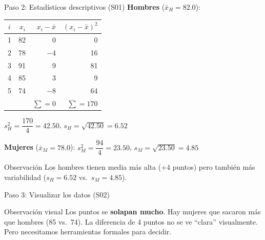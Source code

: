 \documentclass[aspectratio=169, 11pt]{beamer}
\begin{document}
\begin{frame}{Paso 2: Estadísticos descriptivos (S01)}
\small
\textbf{Hombres} ($\bar{x}_H = 82.0$):
\begin{center}
\footnotesize
\begin{tabular}{crrr}
\toprule
$i$ & $x_i$ & $x_i - \bar{x}$ & $(x_i - \bar{x})^2$ \\
\midrule
1 & 82 & 0 & 0 \\
2 & 78 & $-4$ & 16 \\
3 & 91 & 9 & 81 \\
4 & 85 & 3 & 9 \\
5 & 74 & $-8$ & 64 \\
\midrule
 & & $\sum = 0$ & $\sum = 170$ \\
\bottomrule
\end{tabular}
\end{center}
$s_H^2 = \dfrac{170}{4} = 42.50$, \quad $s_H = \sqrt{42.50} = 6.52$

\vspace{0.2cm}
\textbf{Mujeres} ($\bar{x}_M = 78.0$): \quad
$s_M^2 = \dfrac{94}{4} = 23.50$, \quad $s_M = \sqrt{23.50} = 4.85$

\vspace{0.2cm}
\begin{block}{Observación}
Los hombres tienen media más alta (+4 puntos) pero también más variabilidad ($s_H = 6.52$ vs.\ $s_M = 4.85$).
\end{block}
\end{frame}

\begin{frame}{Paso 3: Visualizar los datos (S02)}
\small

\begin{center}
\end{center}

\begin{block}{Observación visual}
Los puntos se \textbf{solapan mucho}. Hay mujeres que sacaron más que hombres (85 vs.\ 74). La diferencia de 4 puntos no se ve ``clara'' visualmente. Pero necesitamos herramientas formales para decidir.
\end{block}
\end{frame}
\end{document}

